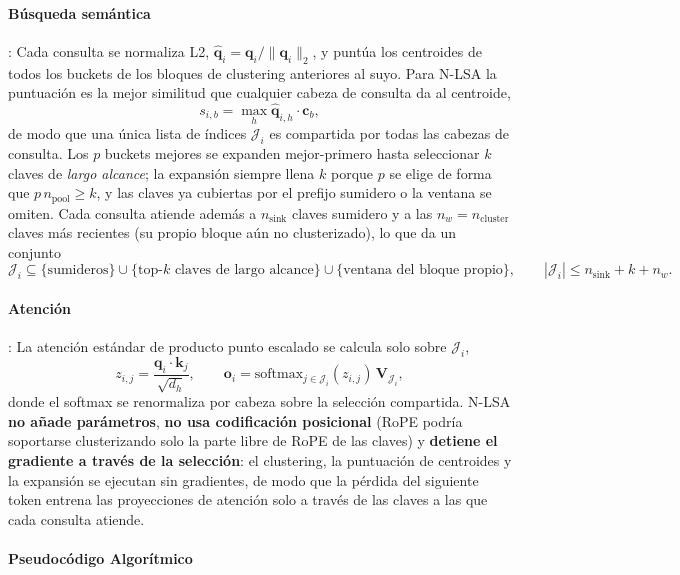 \paragraph{Búsqueda semántica}: Cada consulta se normaliza L2, $\hat{\mathbf{q}}_i = \mathbf{q}_i/\lVert \mathbf{q}_i \rVert_2$, y puntúa los centroides de todos los buckets de los bloques de clustering anteriores al suyo. Para N-LSA la puntuación es la mejor similitud que cualquier cabeza de consulta da al centroide,
\[
s_{i,b} = \max_h \hat{\mathbf{q}}_{i,h} \cdot \mathbf{c}_b,
\]
de modo que una única lista de índices $\mathcal{J}_i$ es compartida por todas las cabezas de consulta. Los $p$ buckets mejores se expanden mejor-primero hasta seleccionar $k$ claves de \emph{largo alcance}; la expansión siempre llena $k$ porque $p$ se elige de forma que $p\, n_{\text{pool}} \ge k$, y las claves ya cubiertas por el prefijo sumidero o la ventana se omiten. Cada consulta atiende además a $n_{\text{sink}}$ claves sumidero y a las $n_w = n_{\text{cluster}}$ claves más recientes (su propio bloque aún no clusterizado), lo que da un conjunto
\[
\mathcal{J}_i \subseteq \{\text{sumideros}\} \cup \{\text{top-}k \text{ claves de largo alcance}\} \cup \{\text{ventana del bloque propio}\}, \qquad |\mathcal{J}_i| \le n_{\text{sink}} + k + n_w .
\]

\paragraph{Atención}: La atención estándar de producto punto escalado se calcula solo sobre $\mathcal{J}_i$,
\[
z_{i,j} = \frac{\mathbf{q}_i \cdot \mathbf{k}_j}{\sqrt{d_h}}, \qquad
\mathbf{o}_i = \mathrm{softmax}_{j \in \mathcal{J}_i}(z_{i,j})\, \mathbf{V}_{\mathcal{J}_i},
\]
donde el softmax se renormaliza por cabeza sobre la selección compartida. N-LSA \textbf{no añade parámetros}, \textbf{no usa codificación posicional} (RoPE podría soportarse clusterizando solo la parte libre de RoPE de las claves) y \textbf{detiene el gradiente a través de la selección}: el clustering, la puntuación de centroides y la expansión se ejecutan sin gradientes, de modo que la pérdida del siguiente token entrena las proyecciones de atención solo a través de las claves a las que cada consulta atiende.

\paragraph{Pseudocódigo Algorítmico}

